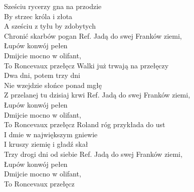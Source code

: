 
Sześciu rycerzy gna na przodzie\\ 
By strzec króla i złota\\
A sześciu z tyłu by zdobytych\\
Chronić skarbów pogan  
\hops
Ref. Jadą do swej Franków ziemi, \\
 Łupów konwój pełen  \\
 Dmijcie mocno w olifant, \\
 To Roncevaux przełęcz 
\hops
Walki już trwają na przełęczy \\
Dwa dni, potem trzy dni  \\
Nie wzejdzie słońce ponad mgłę\\
Z przelanej tu dzisiaj krwi  
\hops
Ref. Jadą do swej Franków ziemi, \\
 Łupów konwój pełen  \\
 Dmijcie mocno w olifant, \\
 To Roncevaux przełęcz 
\hops
Roland róg przykłada do ust\\
I dmie w największym gniewie \\
I kruszy ziemię i gładź skał \\
Trzy drogi dni od siebie  
\hops
Ref. Jadą do swej Franków ziemi, \\
 Łupów konwój pełen  \\
 Dmijcie mocno w olifant, \\
 To Roncevaux przełęcz